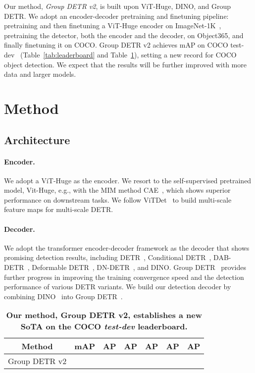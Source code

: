 \documentclass[10pt,twocolumn,letterpaper]{article}
\begin{document}
Our method, {\em Group DETR v2}, is built upon ViT-Huge, DINO, and Group DETR. 
We adopt an encoder-decoder pretraining and finetuning pipeline: 
pretraining and then
finetuning a ViT-Huge encoder on ImageNet-1K~\cite{deng2009imagenet}, 
pretraining the detector, both the encoder and the decoder, on Object365, 
and finally finetuning it on COCO. 
Group DETR v2 achieves  mAP on COCO test-dev~\cite{lin2014microsoft} (Table~\ref{tab:leaderboard} and Table~\ref{tab:coco_dev}), setting a new record for COCO object detection. 
We expect that the results will be further improved with more data and larger models. 

\section{Method} \label{sec:method}

\subsection{Architecture} \label{modeling}

\paragraph{Encoder.}
We adopt a ViT-Huge as the encoder.  We resort to the self-supervised pretrained model, Vit-Huge, e.g., with the MIM method CAE~\cite{chen2022context},
which shows superior performance on downstream tasks. 
We follow ViTDet~\cite{li2022exploring} to build multi-scale feature maps for multi-scale DETR.

\paragraph{Decoder.}
We adopt the transformer encoder-decoder framework as the decoder that shows promising detection results, including DETR~\cite{carion2020end}, Conditional DETR~\cite{meng2021conditional}, DAB-DETR~\cite{liu2022dab}, Deformable DETR~\cite{zhu2020deformable}, DN-DETR~\cite{li2022dn}, and DINO\cite{zhang2022dino}. Group DETR~\cite{chen2022group} provides further progress in improving the training convergence speed and the detection performance of various DETR variants. 
We build our detection decoder by combining DINO~\cite{zhang2022dino} 
into Group DETR~\cite{chen2022group}.


\begin{table}
  \centering
    \setlength{\tabcolsep}{5pt}
    \renewcommand{\arraystretch}{1.3}
    \footnotesize    
  \caption{\textbf{Our method, Group DETR v2, establishes
  a new SoTA on the COCO {\em test-dev} leaderboard.} }
  \begin{tabular}{c|cccccc}
    \toprule
    Method &  mAP & AP &  AP & AP & AP & AP \\
    \midrule
    Group DETR v2  &  &  &  &  &  &  \\
    \bottomrule
  \end{tabular}
  \label{tab:coco_dev}
\end{table}
\end{document}
